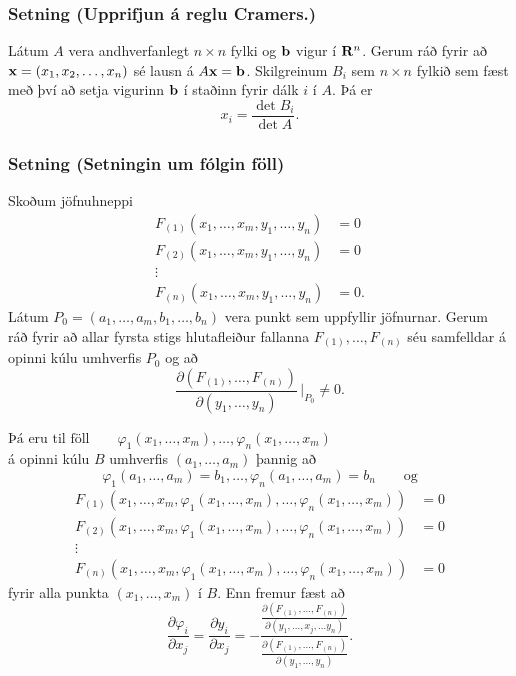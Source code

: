 \subsubsection{Setning (Upprifjun á reglu Cramers.)}

 Látum $A$ vera andhverfanlegt
$n\times n$ fylki og $\mbox{${\bf b}$}$ vigur í $\mbox{${\bf R}^n$}$.  Gerum ráð fyrir að
$\mbox{${\bf x}$}=(x_1, x_2, \ldots, x_n)$ sé lausn á $A\mbox{${\bf x}$}=\mbox{${\bf b}$}$.  Skilgreinum
$B_i$ sem $n\times n$ fylkið sem fæst með því að setja vigurinn $\mbox{${\bf b}$}$
í staðinn fyrir dálk $i$ í $A$.  Þá er
$$x_i=\frac{\det B_i}{\det A}.$$




\subsubsection{Setning (Setningin um fólgin föll)}
Skoðum jöfnuhneppi
\begin{align*}
F_{(1)}(x_1,\ldots,x_m, y_1, \ldots, y_n)&=0\\
F_{(2)}(x_1,\ldots,x_m, y_1, \ldots, y_n)&=0\\
\vdots\\
F_{(n)}(x_1,\ldots,x_m, y_1, \ldots, y_n)&=0.
\end{align*}
Látum $P_0=(a_1,\ldots, a_m, b_1,\ldots, b_n)$ vera punkt sem uppfyllir
jöfnurnar.   
Gerum ráð fyrir að allar fyrsta stigs
hlutafleiður fallanna $F_{(1)},\ldots, F_{(n)}$ séu samfelldar á opinni kúlu umhverfis $P_0$ og að
$$\frac{\partial(F_{(1)}, \ldots, F_{(n)})}
{\partial( y_1, \ldots, y_n)}\,\bigg|_{P_0}\neq 0.$$


$\text{Þá eru til föll} \qquad \varphi_1(x_1,\ldots,x_m),\ldots,\varphi_n(x_1,\ldots,x_m)$ \\
á opinni kúlu $B$ umhverfis $(a_1,\ldots,a_m)$
þannig að 
$$\varphi_1(a_1,\ldots,a_m)=b_1,\ldots,\varphi_n(a_1,\ldots,a_m)=b_n \qquad \text{og}$$
\begin{align*}
F_{(1)}(x_1,\ldots,x_m, \varphi_1(x_1,\ldots,x_m),\ldots,
\varphi_n(x_1,\ldots,x_m))&=0\\
F_{(2)}(x_1,\ldots,x_m, \varphi_1(x_1,\ldots,x_m),\ldots,
\varphi_n(x_1,\ldots,x_m))&=0\\
\vdots\\
F_{(n)}(x_1,\ldots,x_m, \varphi_1(x_1,\ldots,x_m),\ldots,
\varphi_n(x_1,\ldots,x_m))&=0
\end{align*}
fyrir alla punkta $(x_1,\ldots,x_m)$ í $B$.
Enn fremur fæst að %
$$\frac{\partial \varphi_i}{\partial x_j}
=\frac{\partial y_i}{\partial x_j}
=-\frac{\frac{\partial(F_{(1)}, \ldots, F_{(n)})}
{\partial( y_1, \ldots,x_j,\ldots y_n)}}
{\frac{\partial(F_{(1)}, \ldots, F_{(n)})}{\partial( y_1, \ldots, y_n)}}.$$



